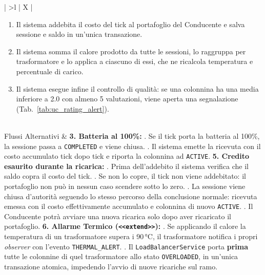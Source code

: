\begin{xltabular}{\textwidth}{| >{\bfseries}l | X |}
\begin{enumerate}[leftmargin=*, nosep]
\begin{itemize}[leftmargin=*, nosep]
        \item \textbf{Eco Charge:} sullo stesso prezzo base è applicato un ulteriore sconto del 10\%; la sessione genera metà del calore.
    \end{itemize}
    \item Il sistema addebita il costo del tick al portafoglio del Conducente e salva sessione e saldo in un'unica transazione.
    \item Il sistema somma il calore prodotto da tutte le sessioni, lo raggruppa per trasformatore e lo applica a ciascuno di essi, che ne ricalcola temperatura e percentuale di carico.
    \item Il sistema esegue infine il controllo di qualità: se una colonnina ha una media inferiore a 2.0 con almeno 5 valutazioni, viene aperta una segnalazione (Tab.~\ref{tab:uc_rating_alert}).
\end{enumerate} \\ \hline
Flussi Alternativi &
\textbf{3. Batteria al 100\%:} . Se il tick porta la batteria al 100\%, la sessione passa a \texttt{COMPLETED} e viene chiusa. . Il sistema emette la ricevuta con il costo accumulato tick dopo tick e riporta la colonnina ad \texttt{ACTIVE}. \newline\newline
\textbf{5. Credito esaurito durante la ricarica:} . Prima dell'addebito il sistema verifica che il saldo copra il costo del tick. . Se non lo copre, il tick non viene addebitato: il portafoglio non può in nessun caso scendere sotto lo zero. . La sessione viene chiusa d'autorità seguendo lo stesso percorso della conclusione normale: ricevuta emessa con il costo effettivamente accumulato e colonnina di nuovo \texttt{ACTIVE}. . Il Conducente potrà avviare una nuova ricarica solo dopo aver ricaricato il portafoglio. \newline\newline
\textbf{6. Allarme Termico (\texttt{<<extend>>}):} . Se applicando il calore la temperatura di un trasformatore supera i 90\,°C, il trasformatore notifica i propri \textit{observer} con l'evento \texttt{THERMAL\_ALERT}. . Il \texttt{LoadBalancerService} porta \textbf{prima} tutte le colonnine di quel trasformatore allo stato \texttt{OVERLOADED}, in un'unica transazione atomica, impedendo l'avvio di nuove ricariche sul ramo. \newline

\end{xltabular}
